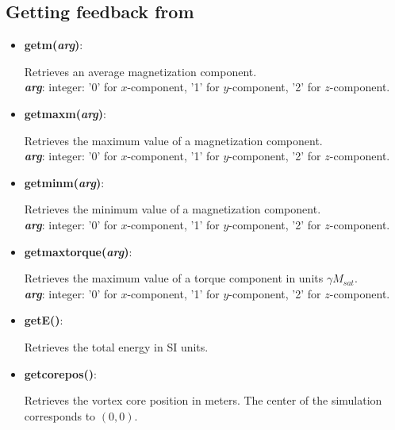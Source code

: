 \subsection{Getting feedback from \mumax}

\begin{itemize}

 \item {\textbf{getm(\textit{arg})}:
				\flushright\parbox{0.9 \textwidth}{\vspace{-0.25cm} 
				Retrieves an average magnetization component.\\
				\textbf{\textit{arg}}: integer: '0' for $x$-component, '1' for $y$-component, '2' for $z$-component.
				}\flushleft}

 \item {\vspace{-0.4cm}\textbf{getmaxm(\textit{arg})}:
				\flushright\parbox{0.9 \textwidth}{\vspace{-0.25cm} 
				Retrieves the maximum value of a magnetization component.\\
				\textbf{\textit{arg}}: integer: '0' for $x$-component, '1' for $y$-component, '2' for $z$-component.
				}\flushleft}

 \item {\vspace{-0.4cm}\textbf{getminm(\textit{arg})}:
				\flushright\parbox{0.9 \textwidth}{\vspace{-0.25cm} 
				Retrieves the minimum value of a magnetization component.\\
				\textbf{\textit{arg}}: integer: '0' for $x$-component, '1' for $y$-component, '2' for $z$-component.
				}\flushleft}

 \item {\vspace{-0.4cm}\textbf{getmaxtorque(\textit{arg})}:
				\flushright\parbox{0.9 \textwidth}{\vspace{-0.25cm} 
				Retrieves the maximum value of a torque component in units $\gamma M_{sat}$.\\
				\textbf{\textit{arg}}: integer: '0' for $x$-component, '1' for $y$-component, '2' for $z$-component.
				}\flushleft}

 \item {\vspace{-0.4cm}\textbf{getE()}:
				\flushright\parbox{0.9 \textwidth}{\vspace{-0.25cm} 
				Retrieves the total energy in SI units.
				}\flushleft}

 \item {\vspace{-0.4cm}\textbf{getcorepos(\textit{})}:
				\flushright\parbox{0.9 \textwidth}{\vspace{-0.25cm} 
				Retrieves the vortex core position in meters.  The center of the simulation corresponds to $(0,0)$.
				}\flushleft}

\end{itemize}

